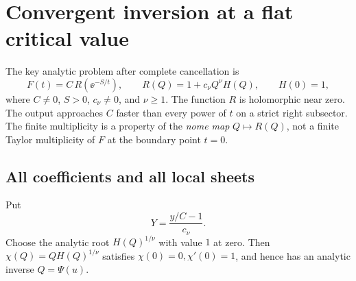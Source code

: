 \section{Convergent inversion at a flat critical value}\label{sec:flat}

The key analytic problem after complete cancellation is
\begin{equation}\label{eq:flat-model}
 F(t)=C\,R(\ee^{-S/t}),\qquad
 R(Q)=1+c_\nu Q^\nu H(Q),\qquad H(0)=1,
\end{equation}
where \(C\ne0\), \(S>0\), \(c_\nu\ne0\), and \(\nu\ge1\).
The function \(R\) is holomorphic near zero.
The output approaches \(C\) faster than every power of \(t\)
on a strict right subsector.
The finite multiplicity is a property of the \emph{nome map}
\(Q\mapsto R(Q)\), not a finite Taylor multiplicity of \(F\)
at the boundary point \(t=0\).

\subsection{All coefficients and all local sheets}

Put
\[
 Y=\frac{y/C-1}{c_\nu}.
\]
Choose the analytic root \(H(Q)^{1/\nu}\) with value \(1\) at
zero.  Then \(\chi(Q)=QH(Q)^{1/\nu}\) satisfies
\(\chi(0)=0,\chi'(0)=1\), and hence has an analytic inverse
\(Q=\Psi(u)\).

